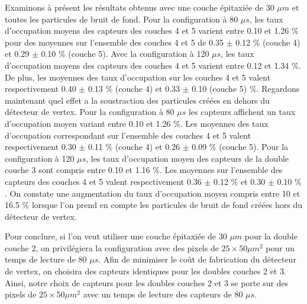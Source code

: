   Examinons \`a pr\'esent les r\'esultats obtenus avec une couche \'epitaxi\'ee de 30 $\mu m$ et toutes les particules de bruit de fond. Pour la configuration \`a 80 $\mu s$, les taux d'occupation moyens des capteurs des couches 4 et 5 varient entre 0.10 et 1.26 $\%$ pour des moyennes sur l'ensemble des couches 4 et 5 de 0.35 $\pm$ 0.12 $\%$ (couche 4) et 0.29 $\pm$ 0.10 $\%$ (couche 5). Avec la configuration \`a 120 $\mu s$, les taux d'occupation moyens des capteurs des couches 4 et 5 varient entre 0.12 et 1.34 $\%$. De plus, les moyennes des taux d'occupation sur les couches 4 et 5 valent respectivement 0.40 $\pm$ 0.13 $\%$ (couche 4) et 0.33 $\pm$ 0.10 (couche 5) $\%$. Regardons maintenant quel effet a la soustraction des particules cr\'e\'ees en dehors du d\'etecteur de vertex. Pour la configuration \`a 80 $\mu s$ les capteurs affichent un taux d'occupation moyen variant entre 0.10 et 1.26 $\%$. Les moyennes des taux d'occupation correspondant sur l'ensemble des couches 4 et 5 valent respectivement 0.30 $\pm$ 0.11 $\%$ (couche 4) et 0.26 $\pm$ 0.09 $\%$ (couche 5). Pour la configuration \`a 120 $\mu s$, les taux d'occupation moyen des capteurs de la double couche 3 sont compris entre 0.10 et 1.16 $\%$. Les moyennes sur l'ensemble des capteurs des couches 4 et 5 valent respectivement 0.36 $\pm$ 0.12 $\%$ et 0.30 $\pm$ 0.10 $\%$. On constate une augmentation du taux d'occupation moyen compris entre 10 et 16.5 $\%$ lorsque l'on prend en compte les particules de bruit de fond cr\'e\'ees hors du d\'etecteur de vertex. 
  

  \medskip
  
  Pour conclure, si l'on veut utiliser une couche \'epitaxi\'ee de 30 $\mu m$ pour la double couche 2, on privil\'egiera la configuration avec des pixels de $25 \times 50 \mu m^2$ pour un temps de lecture de 80 $\mu s$. Afin de minimiser le coût de fabrication du d\'etecteur de vertex, on choisira des capteurs identiques pour les doubles couches 2 et 3. Ainsi, notre choix de capteurs pour les doubles couches 2 et 3 se porte sur des pixels de $25 \times 50 \mu m^2$ avec un temps de lecture des capteurs de 80 $\mu s$.
  
